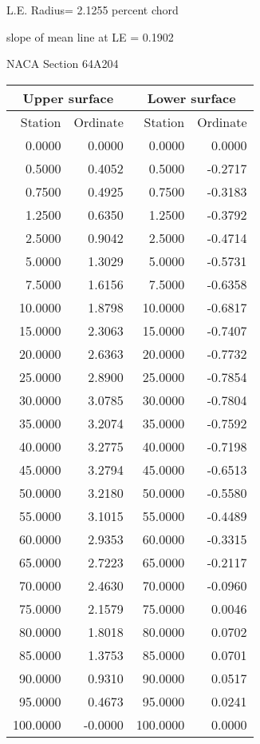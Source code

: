 \documentclass[11pt]{book}
\begin{document}
L.E. Radius=  2.1255 percent chord


 slope of mean line at LE =  0.1902
 \newpage
  \label{s64A204}
 \begin{Large}
 NACA Section 64A204
 \end{Large}
  
 \vspace{8mm}
 \begin{tabular}{|r|r|r|r|} \hline 
 \multicolumn{2}{|c|}{Upper surface} & \multicolumn{2}{|c|}{Lower surface} \\
 \hline
 Station & Ordinate & Station & Ordinate \\
 \hline
0.0000 & 0.0000 & 0.0000 & 0.0000 \\
0.5000 & 0.4052 & 0.5000 & -0.2717 \\
0.7500 & 0.4925 & 0.7500 & -0.3183 \\
1.2500 & 0.6350 & 1.2500 & -0.3792 \\
2.5000 & 0.9042 & 2.5000 & -0.4714 \\
5.0000 & 1.3029 & 5.0000 & -0.5731 \\
7.5000 & 1.6156 & 7.5000 & -0.6358 \\
10.0000 & 1.8798 & 10.0000 & -0.6817 \\
15.0000 & 2.3063 & 15.0000 & -0.7407 \\
20.0000 & 2.6363 & 20.0000 & -0.7732 \\
25.0000 & 2.8900 & 25.0000 & -0.7854 \\
30.0000 & 3.0785 & 30.0000 & -0.7804 \\
35.0000 & 3.2074 & 35.0000 & -0.7592 \\
40.0000 & 3.2775 & 40.0000 & -0.7198 \\
45.0000 & 3.2794 & 45.0000 & -0.6513 \\
50.0000 & 3.2180 & 50.0000 & -0.5580 \\
55.0000 & 3.1015 & 55.0000 & -0.4489 \\
60.0000 & 2.9353 & 60.0000 & -0.3315 \\
65.0000 & 2.7223 & 65.0000 & -0.2117 \\
70.0000 & 2.4630 & 70.0000 & -0.0960 \\
75.0000 & 2.1579 & 75.0000 & 0.0046 \\
80.0000 & 1.8018 & 80.0000 & 0.0702 \\
85.0000 & 1.3753 & 85.0000 & 0.0701 \\
90.0000 & 0.9310 & 90.0000 & 0.0517 \\
95.0000 & 0.4673 & 95.0000 & 0.0241 \\
100.0000 & -0.0000 & 100.0000 & 0.0000 \\
 \hline 
 \end{tabular}
\end{document}
